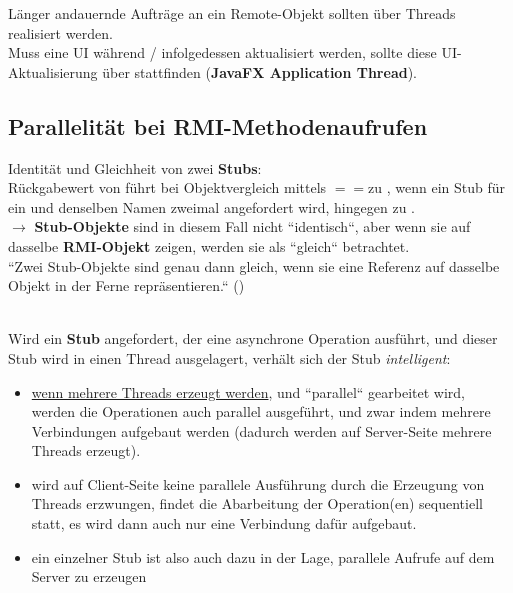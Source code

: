 Länger andauernde Aufträge an ein Remote-Objekt sollten über Threads realisiert werden.\\

\noindent
Muss eine UI während / infolgedessen aktualisiert werden, sollte diese UI-Aktualisierung über  stattfinden (\textbf{JavaFX Application Thread}).


\subsection{Parallelität bei RMI-Methodenaufrufen}\label{sec:rmiparallel}



\begin{tcolorbox}[enlarge top by=0.5cm,enlarge bottom by=0.5cm]
    Identität und Gleichheit von zwei \textbf{Stubs}:\\
    \noindent
    Rückgabewert von  führt bei Objektvergleich mittels $==$zu , wenn ein Stub für ein und denselben Namen zweimal angefordert wird,  hingegen zu .\\

    $\rightarrow$ \textbf{Stub-Objekte} sind in diesem Fall nicht ``identisch``, aber wenn sie auf dasselbe \textbf{RMI-Objekt} zeigen, werden sie als ``gleich`` betrachtet.\\

    ``Zwei Stub-Objekte sind genau dann gleich, wenn sie eine Referenz auf dasselbe Objekt in der Ferne repräsentieren.`` (\cite[347]{Oec22})
\end{tcolorbox}\\

\noindent
Wird ein \textbf{Stub} angefordert, der eine asynchrone Operation ausführt, und dieser Stub wird in einen Thread ausgelagert, verhält sich der Stub \textit{intelligent}:

\begin{itemize}
    \item \ul{wenn mehrere Threads erzeugt werden}, und ``parallel`` gearbeitet wird, werden die Operationen auch parallel ausgeführt, und zwar indem mehrere Verbindungen aufgebaut werden (dadurch werden auf Server-Seite mehrere Threads erzeugt).
    \item wird auf Client-Seite keine parallele Ausführung durch die Erzeugung von Threads erzwungen, findet die Abarbeitung der Operation(en) sequentiell statt, es wird dann auch nur eine Verbindung dafür aufgebaut.
    \item ein einzelner Stub ist also auch dazu in der Lage, parallele Aufrufe auf dem Server zu erzeugen
\end{itemize}

